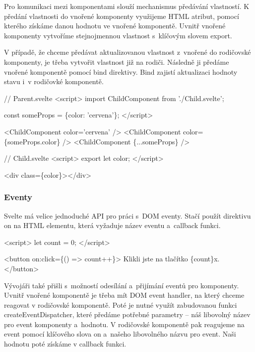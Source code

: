 Pro komunikaci mezi komponentami slouží mechanismus předávání vlastností. 
K předání vlastnosti do vnořené komponenty využijeme HTML atribut, pomocí kterého získáme danou hodnotu ve vnořené komponentě.  
Uvnitř vnořené komponenty vytvoříme stejnojmennou vlastnost s~klíčovým slovem export.

V případě, že chceme předávat aktualizovanou vlastnost z~vnořené do rodičovské komponenty, je třeba vytvořit vlastnost již na rodiči. 
Následně ji předáme vnořené komponentě pomocí bind direktivy. Bind zajistí aktualizaci hodnoty stavu i~v rodičovké komponentě.\cite{svelte}

\begin{prog}
// Parent.svelte
<script>
  import ChildComponent from './Child.svelte';

  const someProps = \{color: 'cervena'\};
</script>

<ChildComponent color='cervena' />
<ChildComponent color=\{someProps.color\} />
<ChildComponent \{...someProps\} />

// Child.svelte
<script>
  export let color;
</script>

<div class=\{color\}></div>
\end{prog}

\subsubsection{Eventy} %

Svelte má velice jednoduché API pro práci s~DOM eventy. Stačí použít direktivu on na HTML elementu, která vyžaduje název eventu a~callback funkci.

\begin{prog}
<script>
  let count = 0;
</script>

<button on:click=\{() => count++\}>
  Klikli jste na tlačítko \{count\}x.
</button>
\end{prog}

Vývojáři také přišli s~možností odesílání a~přijímání eventů pro komponenty. 
Uvnitř vnořené komponentě je třeba mít DOM event handler, na který chceme reagovat v rodičovské komponentě. 
Poté je nutné využít zabudovanou funkci createEventDispatcher, které předáme potřebné parametry -- náš libovolný název pro event komponenty a~hodnotu. 
V rodičovské komponentě pak reagujeme na event pomocí klíčového slova on a~našeho libovolného názvu pro event. Naši hodnotu poté získáme v callback funkci.\cite{sveltehandbook,svelte}

